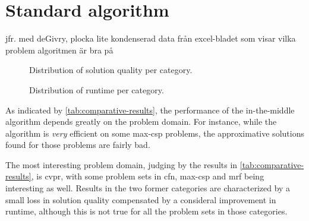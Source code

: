 \section{Standard algorithm}
jfr. med deGivry, plocka lite kondenserad data från excel-bladet som visar vilka problem algoritmen är bra på


\begin{figure}
	\centering
	
	\caption{Distribution of solution quality per category.}
	\label{fig:quality-per-paradigm}
\end{figure}

\begin{figure}
	\centering
	
	\caption{Distribution of runtime per category.}
	\label{fig:time-per-paradigm}
\end{figure}


As indicated by \cref{tab:comparative-results}, the performance of the in-the-middle algorithm depends greatly on the problem domain.
For instance, while the algorithm is \emph{very} efficient on some max-\gls{csp} problems, the approximative solutions found for those problems are fairly bad.

The most interesting problem domain, judging by the results in \cref{tab:comparative-results}, is \gls{cvpr}, with some problem sets in \gls{cfn}, max-\gls{csp} and \gls{mrf} being interesting as well.
Results in the two former categories are characterized by a small loss in solution quality compensated by a consideral improvement in runtime, although this is not true for all the problem sets in those categories.


